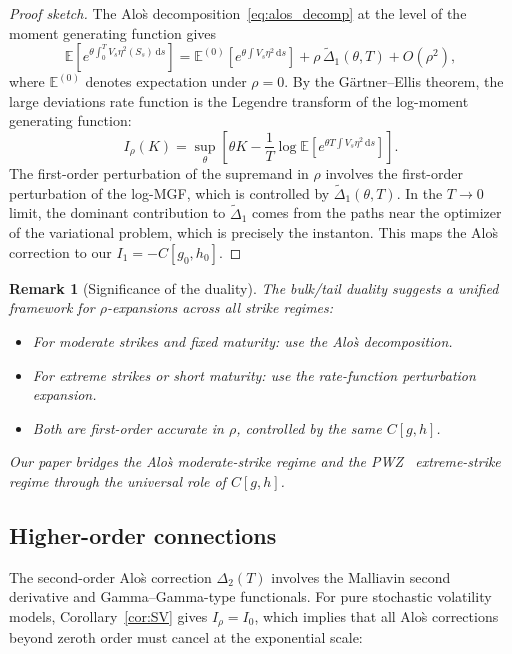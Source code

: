\documentclass[11pt]{article}
\newtheorem{remark}[theorem]{Remark}
\theoremstyle{definition}
\newcommand{\dd}{\mathrm{d}}
\newcommand{\E}{\mathbb{E}}
\begin{document}
\begin{proof}[Proof sketch]
The Alo\`s decomposition~\eqref{eq:alos_decomp} at the level of the moment generating function gives
\begin{equation}
  \E\!\left[e^{\theta\int_0^T V_s\eta^2(S_s)\,\dd s}\right] = \E^{(0)}\!\left[e^{\theta\int V_s\eta^2\,\dd s}\right] + \rho\,\tilde{\Delta}_1(\theta, T) + O(\rho^2),
\end{equation}
where $\E^{(0)}$ denotes expectation under $\rho = 0$. By the G\"artner--Ellis theorem, the large deviations rate function is the Legendre transform of the log-moment generating function:
\begin{equation}
  I_\rho(K) = \sup_\theta\!\left[\theta K - \frac{1}{T}\log \E\!\left[e^{\theta T\int V_s\eta^2\,\dd s}\right]\right].
\end{equation}
The first-order perturbation of the supremand in $\rho$ involves the first-order perturbation of the log-MGF, which is controlled by $\tilde{\Delta}_1(\theta, T)$. In the $T \to 0$ limit, the dominant contribution to $\tilde{\Delta}_1$ comes from the paths near the optimizer of the variational problem, which is precisely the instanton. This maps the Alo\`s correction to our $I_1 = -C[g_0, h_0]$.
\end{proof}

\begin{remark}[Significance of the duality]\label{rem:duality_significance}
The bulk/tail duality suggests a unified framework for $\rho$-expansions across all strike regimes:
\begin{itemize}
  \item For moderate strikes and fixed maturity: use the Alo\`s decomposition.
  \item For extreme strikes or short maturity: use the rate-function perturbation expansion.
  \item Both are first-order accurate in $\rho$, controlled by the same $C[g,h]$.
\end{itemize}
Our paper bridges the Alo\`s moderate-strike regime and the PWZ~\cite{PWZ2025} extreme-strike regime through the universal role of $C[g,h]$.
\end{remark}

\subsection{Higher-order connections}\label{sec:higher_alos}

The second-order Alo\`s correction $\Delta_2(T)$ involves the Malliavin second derivative and Gamma--Gamma-type functionals. For pure stochastic volatility models, Corollary~\ref{cor:SV} gives $I_\rho = I_0$, which implies that all Alo\`s corrections beyond zeroth order must cancel at the exponential scale:
\end{document}
